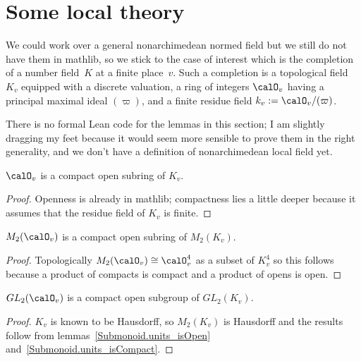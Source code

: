 \section{Some local theory}

We could work over a general nonarchimedean normed field but we still do not have them
in mathlib, so we stick to the case of interest which is the completion of a number
field~$K$ at a finite place~$v$. Such a completion is a topological field~$K_v$
equipped with a discrete valuation, a ring of integers $\calO_v$ having a principal
maximal ideal $(\varpi)$, and a finite residue field $k_v:=\calO_v/(\varpi)$.

There is no formal Lean code for the lemmas in this section; I am slightly dragging my
feet because it would seem more sensible to prove them in the right generality,
and we don't have a definition of nonarchimedean local field yet.

\begin{lemma}
  \label{NumberField.isOpenAdicCompletionIntegers, NumberField.instCompactSpaceAdicCompletionIntegers}
  \leanok
  $\calO_v$ is a compact open subring of $K_v$.
\end{lemma}
\begin{proof}
  \leanok
  Openness is already in mathlib; compactness lies a little deeper because it
  assumes that the residue field of $K_v$ is finite.
\end{proof}

\begin{lemma} $M_2(\calO_v)$ is a compact open subring of $M_2(K_v)$.
  \label{M2.localFullLevel.isOpen, M2.localFullLevel.isCompact}
  \leanok
\end{lemma}
\begin{proof}
  \leanok
  Topologically $M_2(\calO_v)\cong \calO_v^4$ as a subset of $K_v^4$ so this
  follows because a product of compacts is compact and a product of opens is open.
\end{proof}

\begin{lemma} $GL_2(\calO_v)$ is a compact open subgroup of $GL_2(K_v)$.
  \label{nolean-compactopen-GL2}
\end{lemma}
\begin{proof}
  $K_v$ is known to be Hausdorff, so $M_2(K_v)$ is Hausdorff and the
  results follow from lemmas~\ref{Submonoid.units_isOpen} and~\ref{Submonoid.units_isCompact}.
\end{proof}

